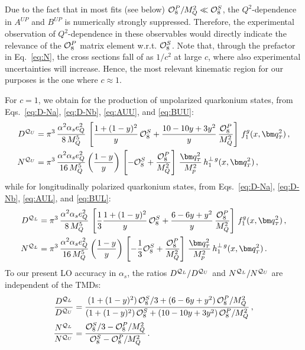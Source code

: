 \documentclass[prd,aps,preprintnumbers,nofootinbib,superscriptaddress]{revtex4}
\newcommand{\sT}{{\scriptscriptstyle T}}
\begin{document}
Due to the fact that in most fits (see below) ${\cal O}_{8}^P/M_Q^2 \ll {\cal O}_{8}^S$, the $Q^2$-dependence in $A^{UP}$ and $B^{UP}$ is numerically strongly suppressed. Therefore, the experimental observation of $Q^2$-dependence in these observables would directly indicate the relevance of the ${\cal O}_{8}^P$ matrix element w.r.t. ${\cal O}_{8}^S$. Note that, through the prefactor in Eq.~\eqref{eq:N}, the cross sections fall of as $1/c^2$ at large $c$, where also experimental uncertainties will increase. Hence, the most relevant kinematic region for our purposes is the one where $c\approx 1$.


For $c=1$, we obtain for the production of unpolarized quarkonium states, from Eqs.~\eqref{eq:D-Na}, \eqref{eq:D-Nb},  \eqref{eq:AUU}, and \eqref{eq:BUU}: 
\begin{align}
D^{{\cal Q}_{U}}
& = \pi^3 \,   \frac{\alpha^2 \alpha_s e^2_Q}{ 8\, M_Q^5}  \,\left [ \frac{1+(1-y)^2}{y} \, {\cal O}_{8}^S+ \frac{10-10y+3y^2 }{y}\,
\frac{{\cal O}_{8}^P}{M_{Q}^{2}}  \right ] \,f_1^g(x, \bm q_\sT^2)\,, \\
N^{{\cal Q}_{U}} 
&= \pi ^3 \, \frac{\alpha^2 \alpha_s e^2_Q}{ 16\, M_Q^5} \left ( \frac{1-y}{y} \right  ) \, \left [-{\cal O}_8^S + \frac{{\cal O}_{8}^P}{M_Q^2} \right ]\,  \frac{\bm q_\sT^2}{ M_p^2}\,h_1^{\perp\, g}(x, \bm q_\sT^2)\,,  
\end{align}
while for longitudinally polarized quarkonium states, from Eqs.~\eqref{eq:D-Na}, \eqref{eq:D-Nb},  \eqref{eq:AUL}, and \eqref{eq:BUL}:
\begin{align}
D^{{\cal Q}_L}
& = \pi^3 \,   \frac{\alpha^2 \alpha_s e^2_Q}{ 8\, M_Q^5}  \,\left [ \frac{1}{3}\frac{1+(1-y)^2}{y} \, {\cal O}_{8}^S+ \frac{6-6y+y^2 }{y}\,
\frac{{\cal O}_{8}^P}{M_{Q}^{2}}  \right ] \,f_1^g(x, \bm q_\sT^2)\,, \\
N^{{\cal Q}_L} 
&= \pi ^3 \, \frac{\alpha^2 \alpha_s e^2_Q}{ 16\, M_Q^5} \left ( \frac{1-y}{y} \right  ) \, \left [-\frac{1}{3} {\cal O}_8^S + \frac{{\cal O}_{8}^P}{M_Q^2} \right ]\,  \frac{\bm q_\sT^2}{ M_p^2}\,h_1^{\perp\, g}(x, \bm q_\sT^2)\,. 
\end{align}
To our present LO accuracy in $\alpha_s$, the ratios $D^{{\cal Q}_L}/D^{{\cal Q}_{U}}$ and $N^{{\cal Q}_L}/N^{{\cal Q}_{U}}$ are independent of the TMDs:
\begin{align}
\frac{D^{{\cal Q}_L}}{D^{{\cal Q}_{U}}}
& = \frac{(1+(1-y)^2) \, {\cal O}_{8}^S/3+ (6-6y+y^2)\, {\cal O}_{8}^P/M_{Q}^{2}}{(1+(1-y)^2) \, {\cal O}_{8}^S+ (10-10y+3y^2)\,{\cal O}_{8}^P/M_{Q}^{2}}\,, \\
\frac{N^{{\cal Q}_L}}{N^{{\cal Q}_{U}}}
&= \frac{{\cal O}_8^S/3 - {\cal O}_{8}^P/M_Q^2}{{\cal O}_8^S - {\cal O}_{8}^P/M_Q^2}\,. 
\end{align}
\end{document}
